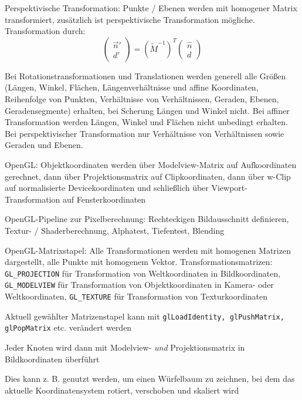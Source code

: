 \documentclass[12pt,landscape]{article}
\begin{document}
\begin{multicols}{3}
\begin{compactitem}
\item Perspektivische Transformation: Punkte / Ebenen werden mit homogener Matrix transformiert, zusätzlich ist perspektivische Transformation mögliche. Transformation durch: 
\[ \begin{pmatrix}\vec{n}' \\ d'\end{pmatrix} = (\tilde{M}^{-1})^{T} \begin{pmatrix}\hat{n} \\ d \end{pmatrix}\]
\item Bei Rotationstransformationen und Translationen werden generell alle Größen (Längen, Winkel, Flächen, Längenverhältnisse und affine Koordinaten, Reihenfolge von Punkten, Verhältnisse von Verhältnissen, Geraden, Ebenen, Geradensegmente) erhalten, bei Scherung Längen und Winkel nicht. Bei affiner Transformation werden Längen, Winkel und Flächen nicht unbedingt erhalten. Bei perspektivischer Transformation nur Verhältnisse von Verhältnissen sowie Geraden und Ebenen.
\item OpenGL: Objektkoordinaten werden über Modelview-Matrix auf Aufkoordinaten gerechnet, dann über Projektionsmatrix auf Clipkoordinaten, dann über w-Clip auf normalisierte Devicekoordinaten und schließlich über Viewport-Transformation auf Fensterkoordinaten
\item OpenGL-Pipeline zur Pixelberechnung: Rechteckigen Bildausschnitt definieren, Textur- / Shaderberechnung, Alphatest, Tiefentest, Blending
\item OpenGL-Matrixstapel: Alle Transformationen werden mit homogenen Matrizen dargestellt, alle Punkte mit homogenem Vektor. Transformationsmatrizen: \lstinline|GL_PROJECTION| für Transformation von Weltkoordinaten in Bildkoordinaten, \lstinline|GL_MODELVIEW| für Transformation von Objektkoordinaten in Kamera- oder Weltkoordinaten, \lstinline|GL_TEXTURE| für Transformation von Texturkoordinaten
\item Aktuell gewählter Matrizenstapel kann mit \lstinline|glLoadIdentity, glPushMatrix, glPopMatrix| etc. verändert werden
\item Jeder Knoten wird dann mit Modelview- \textit{und} Projektionsmatrix in Bildkoordinaten überführt
\item Dies kann z. B. genutzt werden, um einen Würfelbaum zu zeichnen, bei dem das aktuelle Koordinatensystem rotiert, verschoben und skaliert wird
\end{compactitem}

\end{multicols}
\end{document}
